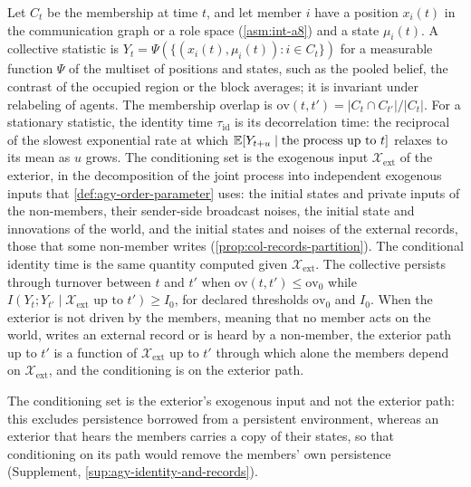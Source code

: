 \begin{definition}\label{def:agy-identity}
Let $C_t$ be the membership at time $t$, and let member $i$ have a position $x_i(t)$ in the communication graph or a role space (\cref{asm:int-a8}) and a state $\mu_i(t)$. A collective statistic is $Y_t=\Psi(\{(x_i(t),\mu_i(t)):i\in C_t\})$ for a measurable function $\Psi$ of the multiset of positions and states, such as the pooled belief, the contrast of the occupied region or the block averages; it is invariant under relabeling of agents. The membership overlap is $\mathrm{ov}(t,t')=\lvert C_t\cap C_{t'}\rvert/\lvert C_t\rvert$. For a stationary statistic, the identity time $\tau_{\mathrm{id}}$ is its decorrelation time: the reciprocal of the slowest exponential rate at which $\mathbb{E}[Y_{t+u}\mid\text{the process up to }t]$ relaxes to its mean as $u$ grows. The conditioning set is the exogenous input $\mathcal X_{\mathrm{ext}}$ of the exterior, in the decomposition of the joint process into independent exogenous inputs that \cref{def:agy-order-parameter} uses: the initial states and private inputs of the non-members, their sender-side broadcast noises, the initial state and innovations of the world, and the initial states and noises of the external records, those that some non-member writes (\cref{prop:col-records-partition}). The conditional identity time is the same quantity computed given $\mathcal X_{\mathrm{ext}}$. The collective persists through turnover between $t$ and $t'$ when $\mathrm{ov}(t,t')\le\mathrm{ov}_0$ while $I(Y_t;Y_{t'}\mid\mathcal X_{\mathrm{ext}}\text{ up to }t')\ge I_0$, for declared thresholds $\mathrm{ov}_0$ and $I_0$. When the exterior is not driven by the members, meaning that no member acts on the world, writes an external record or is heard by a non-member, the exterior path up to $t'$ is a function of $\mathcal X_{\mathrm{ext}}$ up to $t'$ through which alone the members depend on $\mathcal X_{\mathrm{ext}}$, and the conditioning is on the exterior path.
\end{definition}

The conditioning set is the exterior's exogenous input and not the exterior path: this excludes persistence borrowed from a persistent environment, whereas an exterior that hears the members carries a copy of their states, so that conditioning on its path would remove the members' own persistence (Supplement, \cref{sup:agy-identity-and-records}).

